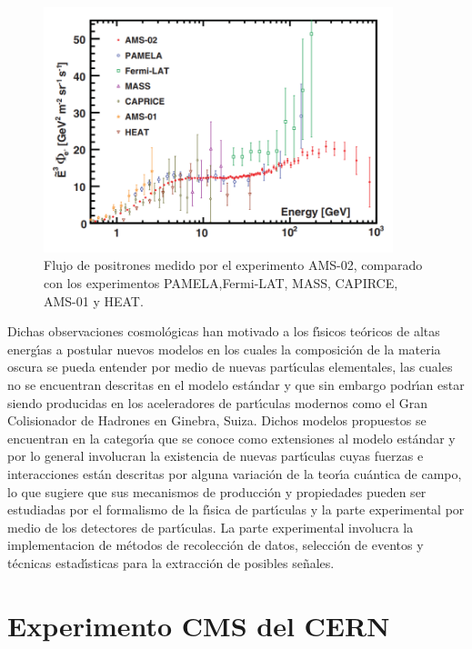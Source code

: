 \begin{figure}
\begin{center}
 \includegraphics[width=4.0in]{AMS_positronflux.png}
  \caption{Flujo de positrones medido por el experimento AMS-02, comparado con los experimentos PAMELA,Fermi-LAT, MASS, CAPIRCE, AMS-01 y HEAT.}
 \label{fig:AMS_positron}
 \end{center}
\end{figure}

Dichas observaciones cosmol\'ogicas han motivado a los f\'{\i}sicos te\'oricos de altas energ\'{\i}as a postular nuevos modelos en los cuales la composici\'on de la materia oscura se pueda entender por medio de nuevas part\'{\i}culas elementales, las cuales no se encuentran descritas en el modelo est\'andar y que sin embargo podr\'{\i}an estar siendo producidas en los aceleradores de part\'{\i}culas modernos como el Gran Colisionador de Hadrones en Ginebra, Suiza.  Dichos modelos propuestos se encuentran en la categor\'{\i}a que se conoce como extensiones al modelo est\'andar y por lo general involucran la existencia de nuevas part\'{\i}culas cuyas fuerzas e interacciones est\'an descritas por alguna variaci\'on de la teor\'{\i}a cu\'antica de campo, lo que sugiere que sus mecanismos de producci\'on y propiedades pueden ser estudiadas por el formalismo de la f\'{\i}sica de part\'{\i}culas y la parte experimental por medio de los detectores de part\'{\i}culas. La parte experimental involucra la implementacion de m\'etodos de recolecci\'on de datos, selecci\'on de eventos y t\'ecnicas estad\'{\i}sticas para la extracci\'on de posibles se\~nales.

\section{Experimento CMS del CERN}
\label{cap:cms}

